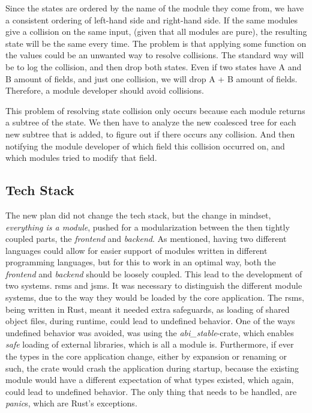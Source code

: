 Since the states are ordered by the name of the module they come from, we
have a consistent ordering of left-hand side and right-hand side. If the same
modules give a collision on the same input, (given that all modules are pure), the
resulting state will be the same every time. The problem is that applying some
function on the values could be an unwanted way to resolve collisions. The
standard way will be to log the collision, and then drop both states. Even
if two states have A and B amount of fields, and just one collision, we will
drop A + B amount of fields. Therefore, a module developer should avoid
collisions.


This problem of resolving state collision only occurs because each module
returns a subtree of the state. We then have to analyze the new coalesced tree
for each new subtree that is added, to figure out if there occurs any collision.
And then notifying the module developer of which field this collision occurred
on, and which modules tried to modify that field.

\subsection{Tech Stack}

The new plan did not change the tech stack, but the change in mindset,
 \textit{everything is a module}, pushed for a
modularization between the then tightly coupled parts, the \textit{frontend} and
\textit{backend}. As mentioned, having two different languages could allow for
easier support of modules written in different programming languages, but for
this to work in an optimal way, both
the \textit{frontend} and \textit{backend} should be loosely coupled. This lead
to the development of two systems. \gls{rsms} and \gls{jsms}.
It was necessary to distinguish the different module systems, due to the way
they would be loaded by the core application.
The \gls{rsms}, being written in Rust, meant it needed extra safeguards, as
loading of shared object files, during runtime, could lead to undefined
behavior.
One of the ways undefined behavior was avoided, was using the
\textit{abi\_stable}-crate, which enables \textit{safe} loading of external
libraries, which is all a module is.
Furthermore, if ever the types in the core application change, either by
expansion or renaming or such, the crate would crash the application during
startup, because the existing module would have a different expectation of what
types existed, which again, could lead to undefined behavior. The only thing
that needs to be handled, are \textit{panic}s, which are Rust's exceptions.

